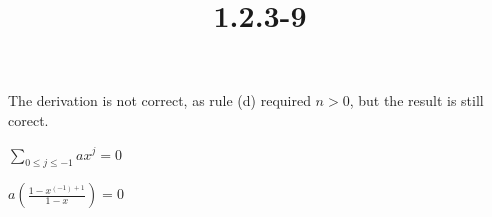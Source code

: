 \documentclass{article}
\title{1.2.3-9}
\begin{document}
\maketitle

The derivation is not correct, as rule (d) required \( n > 0 \), but the result is still corect.

\( \sum_{0 \leq j \leq -1} ax^j = 0 \)

\( a(\frac{1-x^{(-1)+1}}{1-x}) = 0 \)
\end{document}
